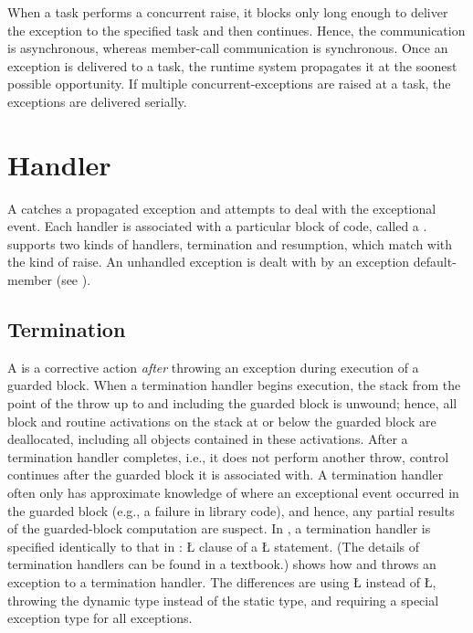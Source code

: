 \documentclass[openright,twoside]{report}
\begin{document}
When a task performs a concurrent raise, it blocks only long enough to deliver the exception to the specified task and then continues.
Hence, the communication is asynchronous, whereas member-call communication is synchronous.
Once an exception is delivered to a task, the runtime system propagates it at the soonest possible opportunity.
If multiple concurrent-exceptions are raised at a task, the exceptions are delivered serially.


\section{Handler}

A  catches a propagated exception and attempts to deal with the exceptional event.
Each handler is associated with a particular block of code, called a .
\uC supports two kinds of handlers, termination and resumption, which match with the kind of raise.
An unhandled exception is dealt with by an exception default-member (see ).


\subsection{Termination}

A  is a corrective action \emph{after} throwing an exception during execution of a guarded block.
When a termination handler begins execution, the stack from the point of the throw up to and including the guarded block is unwound;
hence, all block and routine activations on the stack at or below the guarded block are deallocated, including all objects contained in these activations.
After a termination handler completes, i.e., it does not perform another throw, control continues after the guarded block it is associated with.
A termination handler often only has approximate knowledge of where an exceptional event occurred in the guarded block (e.g., a failure in library code), and hence, any partial results of the guarded-block computation are suspect.
In \uC, a termination handler is specified identically to that in \CC: \LGinlinetrue\LGbegin\lgrinde\L{}\endlgrinde\LGend{} clause of a \LGinlinetrue\LGbegin\lgrinde\L{}\endlgrinde\LGend{} statement.
(The details of termination handlers can be found in a \CC textbook.)
 shows how \CC and \uC throws an exception to a termination handler.
The differences are using \LGinlinetrue\LGbegin\lgrinde\L{}\endlgrinde\LGend{} instead of \LGinlinetrue\LGbegin\lgrinde\L{}\endlgrinde\LGend{}, throwing the dynamic type instead of the static type, and requiring a special exception type for all exceptions.
\end{document}
